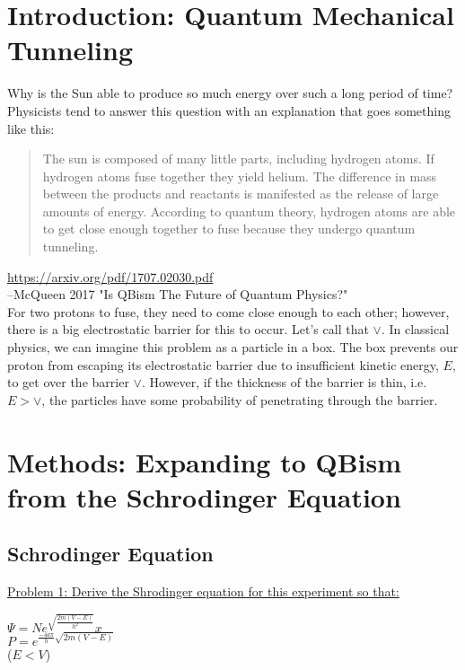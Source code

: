 \documentclass[]{article}
\date{}
\begin{document}
\section*{Introduction: Quantum Mechanical Tunneling}
Why is the Sun able to produce so much energy over such a long period of time? Physicists tend to answer this question with an explanation that goes something like this:

\begin{quote} The sun is composed of many little parts, including hydrogen atoms. If hydrogen atoms fuse together they yield helium. The difference in mass between the products and reactants is manifested as the release of large amounts of energy. According to quantum theory, hydrogen atoms are able to get close enough together to fuse because they undergo quantum tunneling.
\end{quote}
{\small\url{https://arxiv.org/pdf/1707.02030.pdf}\\
--McQueen 2017 "Is QBism The Future of Quantum Physics?"}\\

For two protons to fuse, they need to come close enough to each other; however, there is a big electrostatic barrier for this to occur. Let's call that $\vee$. In classical physics, we can imagine this problem as a particle in a box. The box prevents our proton from escaping its electrostatic barrier due to insufficient kinetic energy, $E$, to get over the barrier $\vee$. However, if the thickness of the barrier is thin, i.e. $E > \vee$, the particles have some probability of penetrating through the barrier.\\

\section*{Methods: Expanding to QBism from the Schrodinger Equation}
\subsection{Schrodinger Equation}
\underline{Problem 1: Derive the Shrodinger equation for this experiment so that:}
\medskip
{\centering
  
  $\Psi = Ne^{\sqrt{\frac{2m(V-E)}{h^{2}}}}x$\\
  \vspace{5mm}
  $P = e^{\frac{-4a\pi}{h}\sqrt{2m(V-E)}}$\\
  \vspace{5mm}
  ($E<V$)
  \par
}
\end{document}
